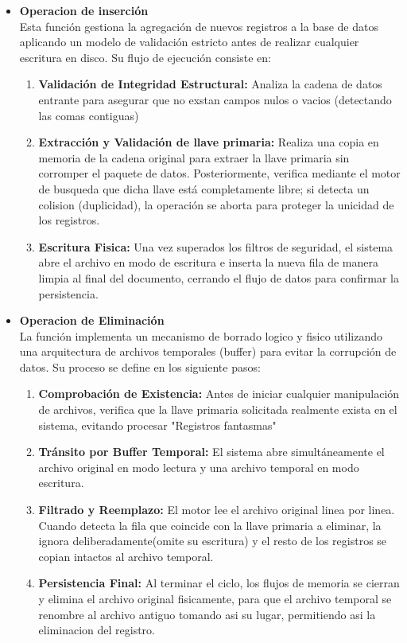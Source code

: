 \documentclass[12pt]{article}
\begin{document}
\begin{itemize}
    \item \textbf{Operacion de inserción} \\
    Esta función gestiona la agregación de nuevos registros a la base de datos aplicando un modelo de validación estricto antes de realizar cualquier escritura en disco. Su flujo de ejecución consiste en:
    \begin{enumerate}
        \item \textbf{Validación de Integridad Estructural:} Analiza la cadena de datos entrante para asegurar que no exstan campos nulos o vacios (detectando las comas contiguas)
        \item \textbf{Extracción y Validación de llave primaria:} Realiza una copia en memoria de la cadena original para extraer la llave primaria sin corromper el paquete de datos. Posteriormente, verifica mediante el motor de busqueda que dicha llave está completamente libre; si detecta un colision (duplicidad), la operación se aborta para proteger la unicidad de los registros. 
        \item \textbf{Escritura Fisica:} Una vez superados los filtros de seguridad, el sistema abre el archivo en modo de escritura e inserta la nueva fila de manera limpia al final del documento, cerrando el flujo de datos para confirmar la persistencia.
    \end{enumerate}
    \item \textbf{Operacion de Eliminación} \\
    La función implementa un mecanismo de borrado logico y fisico utilizando una arquitectura de archivos temporales (buffer) para evitar la corrupción de datos. Su proceso se define en los siguiente pasos:
    \begin{enumerate}
        \item \textbf{Comprobación de Existencia:} Antes de iniciar cualquier manipulación de archivos, verifica que la llave primaria solicitada realmente exista en el sistema, evitando procesar "Registros fantasmas"
        \item \textbf{Tránsito por Buffer Temporal:} El sistema abre simultáneamente el archivo original en modo lectura y una archivo temporal en modo escritura.
        \item \textbf{Filtrado y Reemplazo:} El motor lee el archivo original linea por linea. Cuando detecta la fila que coincide con la llave primaria a eliminar, la ignora deliberadamente(omite su escritura) y el resto de los registros se copian intactos al archivo temporal.
        \item \textbf{Persistencia Final:} Al terminar el ciclo, los flujos de memoria se cierran y elimina el archivo original fisicamente, para que el archivo temporal se renombre al archivo antiguo tomando asi su lugar, permitiendo asi la eliminacion del registro. 
    \end{enumerate}
\end{itemize}
\end{document}
